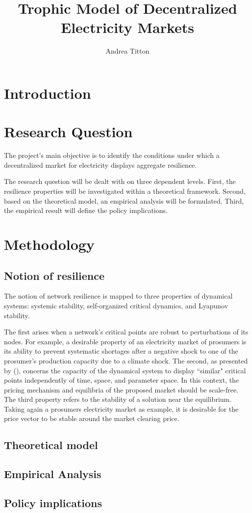 \documentclass[american]{scrartcl}
\title{
        Trophic Model of Decentralized Electricity Markets
    }
\author{Andrea Titton}
\begin{document}
\nocite{*}
\maketitle

\section{Introduction}

\section{Research Question}

The project's main objective is to identify the conditions under which a decentralized market for electricity displays aggregate resilience.

The research question will be dealt with on three dependent levels. First, the resilience properties will be investigated within a theoretical framework. Second, based on the theoretical model, an empirical analysis will be formulated. Third, the empirical result will define the policy implications.

\section{Methodology}

\subsection{Notion of resilience}

The notion of network resilience is mapped to three properties of dynamical systems: systemic stability, self-organized critical dynamics, and Lyapunov stability.

The first arises when a network's critical points are robust to perturbations of its nodes. For example, a desirable property of an electricity market of prosumers is its ability to prevent systematic shortages after a negative shock to one of the prosumer's production capacity due to a climate shock. The second, as presented by \citeauthor{Bak1995} (\citeyear{Bak1995}), concerns the capacity of the dynamical system to display ``similar" critical points independently of time, space, and parameter space. In this context, the pricing mechanism and equilibria of the proposed market should be scale-free. The third property refers to the stability of a solution near the equilibrium. Taking again a prosumers electricity market as example, it is desirable for the price vector to be stable around the market clearing price.

\subsection{Theoretical model}


\subsection{Empirical Analysis}

\subsection{Policy implications}

\newpage

\printbibliography
\end{document}
